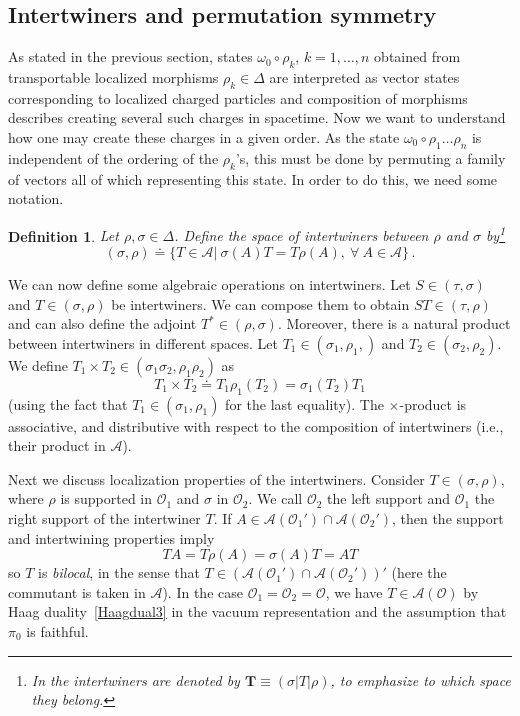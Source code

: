 \documentclass[12pt,a4paper]{article}
\newcommand{\1}{\mathds{1}}                         %
\newcommand{\Ocal}{\mathcal{O}}
\newcommand{\Ac}{{\mathcal{A}}}
\newtheorem{df}[theorem]{Definition}}
\begin{document}
\subsection{Intertwiners and permutation symmetry}\label{sec:intertwiners}
As stated in the previous section, states $\omega_0\circ \rho_k$, $k=1,\dots,n$ obtained from transportable localized morphisms $\rho_k\in \Delta$ are interpreted as vector states corresponding to localized charged particles and composition of morphisms describes creating several such charges in spacetime. Now we want to understand how one may create these charges in a given order. As the state $\omega_0\circ\rho_1\dots \rho_n$ is independent of the ordering of the $\rho_k$'s, this must be done by permuting a family of vectors all of which representing this state. In order to do this, we need some notation.

\begin{df}
	Let $\rho,\sigma\in\Delta$. Define the space of \emph{intertwiners} between $\rho$ and $\sigma$ by\footnote{In \cite{DHR3,DHR4} the intertwiners are denoted by $\mathbf{T}\equiv (\sigma|T|\rho)$, to emphasize to which space they belong.}
	\[
	(\sigma,\rho)\doteq \{T\in\Ac|\ \sigma(A) T=T\rho(A),~\forall~A\in\Ac\}\,.
	\]
\end{df}
We can now define some algebraic operations on intertwiners. Let $S\in (\tau,\sigma)$ and $T\in (\sigma,\rho)$ be intertwiners. We can compose them to obtain $ST\in(\tau,\rho)$ and can also define the adjoint $T^*\in(\rho,\sigma)$. Moreover, there is a natural product between intertwiners in different spaces. Let $T_1\in (\sigma_1,\rho_1,)$ and $T_2\in (\sigma_2,\rho_2)$. We define $ T_1\times T_2\in (\sigma_1\sigma_2,\rho_1\rho_2)$ as
\[
T_1\times T_2\doteq T_1\rho_1(T_2)=\sigma_1(T_2)T_1
\]
(using the fact that $T_1\in (\sigma_1,\rho_1)$ for the last equality).
The $\times$-product is associative, and distributive with respect to the composition of intertwiners (i.e., their product in $\Ac$).

Next we discuss localization properties of the intertwiners.
Consider $T\in(\sigma,\rho)$, where $\rho$ is supported in $\Ocal_1$ and $\sigma$ in $\Ocal_2$. We call $\Ocal_2$ the left support and $\Ocal_1$ the right support of the intertwiner $T$. 
If $A\in \Ac(\Ocal_1')\cap\Ac(\Ocal_2')$, then the support and intertwining properties imply
\[
TA = T\rho(A)= \sigma(A)T = AT
\]
so $T$ is \emph{bilocal}, in the sense that $T\in(\Ac(\Ocal_1')\cap\Ac(\Ocal_2'))'$ (here the commutant is taken in $\Ac$). In the case $\Ocal_1=\Ocal_2=\Ocal$, we have $T\in\Ac(\Ocal)$ by Haag duality~\eqref{Haagdual3} in the vacuum representation and the assumption that $\pi_0$ is faithful.
 
\end{document}
